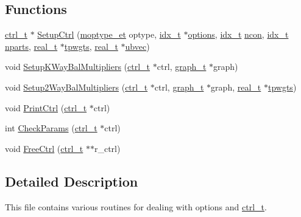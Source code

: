 \subsection*{Functions}
\begin{DoxyCompactItemize}
\item 
\hyperlink{a00742}{ctrl\+\_\+t} $\ast$ \hyperlink{a00254_a1420c4ffbe28e4c3349678037adcb918}{Setup\+Ctrl} (\hyperlink{a00876_a64ee21e6d3a57701a812d0903a2f0401}{moptype\+\_\+et} optype, \hyperlink{a00876_aaa5262be3e700770163401acb0150f52}{idx\+\_\+t} $\ast$\hyperlink{a00879_a68c032ed4161802775c6847d4cb39adf}{options}, \hyperlink{a00876_aaa5262be3e700770163401acb0150f52}{idx\+\_\+t} \hyperlink{a00879_ac1dd31740e8f97fb57dc917ded30253f}{ncon}, \hyperlink{a00876_aaa5262be3e700770163401acb0150f52}{idx\+\_\+t} \hyperlink{a00879_aad88065af88fd6759101788a8e15ce9e}{nparts}, \hyperlink{a00876_a1924a4f6907cc3833213aba1f07fcbe9}{real\+\_\+t} $\ast$\hyperlink{a00879_aa91786cd8ea996ec49ed5b382eb7fc2f}{tpwgts}, \hyperlink{a00876_a1924a4f6907cc3833213aba1f07fcbe9}{real\+\_\+t} $\ast$\hyperlink{a00879_af48bb348bc8440a61f90f137de83f203}{ubvec})
\item 
void \hyperlink{a00254_a3444d1d3ffb5ca450a1affaeb6d71b61}{Setup\+K\+Way\+Bal\+Multipliers} (\hyperlink{a00742}{ctrl\+\_\+t} $\ast$ctrl, \hyperlink{a00734}{graph\+\_\+t} $\ast$graph)
\item 
void \hyperlink{a00254_ab7bde9f22de07a798b97f1f8e83768b1}{Setup2\+Way\+Bal\+Multipliers} (\hyperlink{a00742}{ctrl\+\_\+t} $\ast$ctrl, \hyperlink{a00734}{graph\+\_\+t} $\ast$graph, \hyperlink{a00876_a1924a4f6907cc3833213aba1f07fcbe9}{real\+\_\+t} $\ast$\hyperlink{a00879_aa91786cd8ea996ec49ed5b382eb7fc2f}{tpwgts})
\item 
void \hyperlink{a00254_a2c75ede1a41b19cb3705b998aba3200b}{Print\+Ctrl} (\hyperlink{a00742}{ctrl\+\_\+t} $\ast$ctrl)
\item 
int \hyperlink{a00254_a279ffe27d8412909f9117b5ca4721dce}{Check\+Params} (\hyperlink{a00742}{ctrl\+\_\+t} $\ast$ctrl)
\item 
void \hyperlink{a00254_ab44b3384fa925eae532b7bcc825159d7}{Free\+Ctrl} (\hyperlink{a00742}{ctrl\+\_\+t} $\ast$$\ast$r\+\_\+ctrl)
\end{DoxyCompactItemize}


\subsection{Detailed Description}
This file contains various routines for dealing with options and \hyperlink{a00742}{ctrl\+\_\+t}. 

